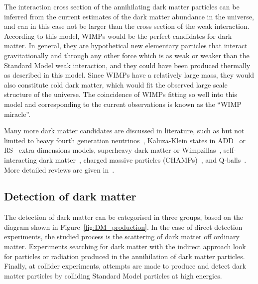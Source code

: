 \begin{itemize}
         The interaction cross section of the annihilating dark matter particles can be inferred from the current estimates of the dark matter abundance in the universe, and can in this case not be larger than the cross section of the weak interaction. According to this model, \acp{WIMP} would be the perfect candidates for dark matter. In general, they are hypothetical new elementary particles that interact gravitationally and through any other force which is as weak or weaker than the Standard Model weak interaction, and they could have been produced thermally as described in this model. Since \acp{WIMP} have a relatively large mass, they would also constitute cold dark matter, which would fit the observed large scale structure of the universe. The coincidence of \acp{WIMP} fitting so well into this model and corresponding to the current observations is known as the ``\ac{WIMP} miracle''.
         
\end{itemize}

Many more dark matter candidates are discussed in literature, such as but not limited to heavy fourth generation neutrinos~\cite{Kainulainen:2002pu}, Kaluza-Klein states in ADD~\cite{ArkaniHamed:1998rs} or RS~\cite{Randall:1999ee} extra dimensions models, superheavy dark matter or Wimpzillas~\cite{Kolb:1998ki}, self-interacting dark matter~\cite{Spergel:1999mh}, charged massive particles (CHAMPs)~\cite{DeRujula:1989fe}, and Q-balls~\cite{Kusenko:1997si}. More detailed reviews are given in~\cite{Ellis:1998gt,Bergstrom:2000pn,Bergstrom:2009ib}.

\subsection{Detection of dark matter}

The detection of dark matter can be categorised in three groups, based on the diagram shown in Figure~\ref{fig:DM_production}. In the case of direct detection experiments, the studied process is the scattering of dark matter off ordinary matter. Experiments searching for dark matter with the indirect approach look for particles or radiation produced in the annihilation of dark matter particles. Finally, at collider experiments, attempts are made to produce and detect dark matter particles by colliding Standard Model particles at high energies.

